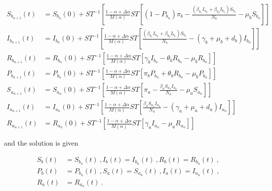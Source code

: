 \documentclass[10pt]{NSP1}
\begin{document}
\begin{equation}
\begin{aligned}
S_{b_{n + 1}}(t) &= S_{b_{n}}(0) + {ST}^{- 1}\left\lbrack \frac{1 - \alpha + \Delta\alpha}{M(\alpha)}ST\left\lbrack \left( 1 - P_{b_{n}} \right)\pi_{b} - \frac{\left( \beta_{b_{1}}I_{a_{n}} + \beta_{b_{2}}I_{b_{n}} \right)S_{b_{n}}}{N_{b}} - \mu_{b}S_{b_{n}} \right\rbrack \right\rbrack \\
I_{b_{n + 1}}(t) &= I_{b_{n}}(0) + {ST}^{- 1}\left\lbrack \frac{1 - \alpha + \Delta\alpha}{M(\alpha)}ST\left\lbrack \frac{\left( \beta_{b_{1}}I_{a_{n}} + \beta_{b_{2}}I_{b_{n}} \right)S_{b_{n}}}{N_{b}} - \left( \gamma_{b} + \mu_{b} + d_{b} \right)I_{b_{n}} \right\rbrack \right\rbrack \\
R_{b_{n + 1}}(t) &= R_{b_{n}}(0) + {ST}^{- 1}\left\lbrack \frac{1 - \alpha + \Delta\alpha}{M(\alpha)}ST\left\lbrack \gamma_{b}I_{b_{n}} - \theta_{b}R_{b_{n}} - \mu_{b}R_{b_{n}} \right\rbrack \right\rbrack \\
P_{b_{n + 1}}(t) &= P_{b_{n}}(0) + {ST}^{- 1}\left\lbrack \frac{1 - \alpha + \Delta\alpha}{M(\alpha)}ST\left\lbrack \pi_{b}P_{b_{n}} + \theta_{b}R_{b_{n}} - \mu_{b}P_{b_{n}} \right\rbrack \right\rbrack \\
S_{a_{n + 1}}(t) &= S_{a_{n}}(0) + {ST}^{- 1}\left\lbrack \frac{1 - \alpha + \Delta\alpha}{M(\alpha)}ST\left\lbrack \pi_{a} - \frac{\beta_{a}S_{a_{n}}I_{a_{n}}}{N_{a}} - \mu_{a}S_{a_{n}} \right\rbrack \right\rbrack \\
I_{a_{n + 1}}(t) &= I_{a_{n}}(0) + {ST}^{- 1}\left\lbrack \frac{1 - \alpha + \Delta\alpha}{M(\alpha)}ST\left\lbrack \frac{\beta_{a}S_{a_{n}}I_{a_{n}}}{N_{a}} - \left( \gamma_{a} + \mu_{a} + d_{a} \right)I_{a_{n}} \right\rbrack \right\rbrack \\
R_{a_{n + 1}}(t) &= R_{a_{n}}(0) + {ST}^{- 1}\left\lbrack \frac{1 - \alpha + \Delta\alpha}{M(\alpha)}ST\left\lbrack \gamma_{a}I_{a_{n}} - \mu_{a}R_{a_{n}} \right\rbrack \right\rbrack
\end{aligned}
\end{equation}

\normalsize

and the solution is given



\begin{equation}
\begin{aligned}
S_{b}(t) &= S_{b_{n}}(t)\ ,I_{b}(t) = I_{b_{n}}(t)\ ,R_{b}(t) = R_{b_{n}}(t)\ , \\
P_{b}(t) &= P_{b_{n}}(t)\ ,S_{a}(t) = S_{a_{n}}(t)\ ,I_{a}(t) = I_{a_{n}}(t)\ , \\
R_{a}(t) &= R_{a_{n}}(t)\ .
\end{aligned}
\end{equation}
\end{document}
